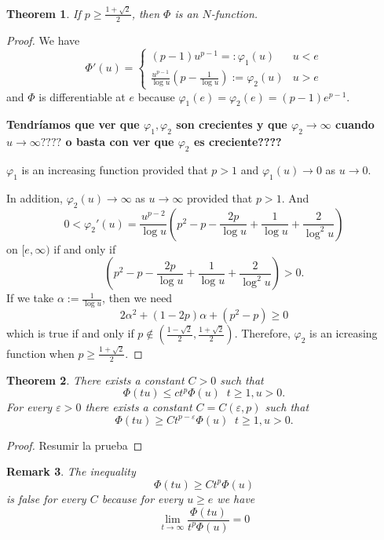 \documentclass[twoside]{article}
\newtheorem{thm}{Theorem}[section]
\newtheorem{rem}[thm]{Remark}
\theoremstyle{remark}
\renewcommand{\leq}{\leqslant}
\begin{document}
\begin{thm}
If $p\geq \frac{1+\sqrt 2}{2}$, then $\Phi$ is an $N$-function.
\end{thm}


\begin{proof}
We have 
\[\Phi'(u)=\left\{
\begin{array}{cl}
(p-1)u^{p-1}=:\varphi_1(u)&u<e
\\
\frac{u^{p-1}}{\log u}(p-\frac{1}{\log u}):=\varphi_2(u)&u>e
\end{array}
\right.
\]
and $\Phi$ is differentiable at $e$ because $\varphi_1(e)=\varphi_2(e)=(p-1)e^{p-1}$.

{\bf Tendr\'iamos que ver que $\varphi_1,\varphi_2$ son crecientes y que $\varphi_2\to \infty$ cuando
$u \to \infty????$ o basta con ver que $\varphi_2$ es creciente????}

$\varphi_1$ is an increasing function provided that $p>1$ and $\varphi_1(u)\to 0$ as $u \to 0$.

In addition, $\varphi_2(u)\to \infty$ as $u \to \infty$ provided that $p>1$.
And 
\[0<\varphi_2'(u)=
\frac{u^{p-2}}{\log u} \left(p^2-p-\frac{2p}{\log u}+\frac{1}{\log u}+\frac{2}{\log^2 u}\right)\] on $[e,\infty)$ if and only if 
\[
\left(p^2-p-\frac{2p}{\log u}+\frac{1}{\log u}+\frac{2}{\log^2 u}\right)>0.
\]
If we take $\alpha:=\frac{1}{\log u}$, then we need 
\[
2\alpha^2+(1-2p)\alpha+(p^2-p)\geq 0
\]
which is true if and only if $p \notin(\frac{1-\sqrt2}{2},\frac{1+\sqrt2}{2})$.
Therefore, $\varphi_2$ is an icreasing function when $p\geq \frac{1+\sqrt2}{2}$.
\end{proof}



\begin{thm}
There exists a constant $C>0$ such that 
\begin{equation}
\Phi(tu)\leq ct^p\Phi(u)\;\;t\geq 1, u>0.
\end{equation}
For every $\varepsilon>0$ there exists a constant $C=C(\varepsilon,p)$ such that
\begin{equation}
\Phi(tu)\geq Ct^{p-\varepsilon}\Phi(u)\;\;t\geq 1,u>0.
\end{equation}
\end{thm}

\begin{proof}
Resumir la prueba
\end{proof}
\begin{rem}
The inequality 
\[
\Phi(tu)\geq Ct^p\Phi(u)
\] 
is false for every $C$ because for every $u\geq e$ we have 
\[
\lim\limits_{t \to \infty}\frac{\Phi(tu)}{t^p\Phi(u)}=0
\]
\end{rem}
\end{document}
